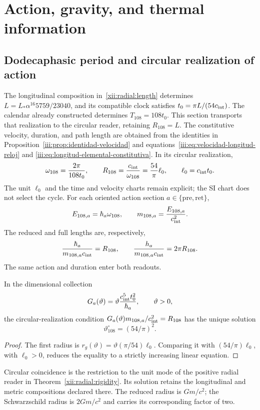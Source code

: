 \section{Action, gravity, and thermal information}
\label{v:ant:sec:gravity}
\subsection{Dodecaphasic period and circular realization of action}
The longitudinal composition in~\eqref{xii:radial:length} determines
\(L=L_*\alpha^{16}5759/23040\), and its compatible clock satisfies
\(t_0=\pi L/(54c_{\rm int})\). The calendar already constructed determines
$T_{108}=108t_0$. This section transports that realization to the
circular reader, retaining \(R_{108}=L\).
The constitutive velocity, duration, and path length are
obtained from the identities in
Proposition~\ref{iii:prop:identidad-velocidad} and
equations~\eqref{iii:eq:velocidad-longitud-reloj} and
\eqref{iii:eq:longitud-elemental-constitutiva}.
In its circular realization,
\[
\omega_{108}=\frac{2\pi}{108t_0},\qquad
R_{108}=\frac{c_{\rm int}}{\omega_{108}}
=\frac{54}{\pi}\ell_0,\qquad \ell_0=c_{\rm int}t_0.
\]
The unit $\ell_0$ and the time and velocity charts remain
explicit; the SI chart does not select the cycle.
For each oriented action section $a\in\{\mathrm{pre},\mathrm{ret}\}$,
\[
E_{108,a}=\hbar_a\omega_{108},\qquad
m_{108,a}=\frac{E_{108,a}}{c_{\rm int}^2}.
\]
The reduced and full lengths are, respectively,
\[
\frac{\hbar_a}{m_{108,a}c_{\rm int}}=R_{108},
\qquad
\frac{h_a}{m_{108,a}c_{\rm int}}=2\pi R_{108}.
\]
The same action and duration enter both readouts.

\begin{proposition}
In the dimensional collection
\[
G_a(\vartheta)=\vartheta\frac{c_{\rm int}^5t_0^2}{\hbar_a},
\qquad \vartheta>0,
\]
the circular-realization condition
$G_a(\vartheta)m_{108,a}/c_{\rm int}^2=R_{108}$
has the unique solution
\[
\vartheta^\circ_{108}=(54/\pi)^2.
\]
\end{proposition}
\begin{proof}
The first radius is
$r_g(\vartheta)=\vartheta(\pi/54)\ell_0$.
Comparing it with $(54/\pi)\ell_0$, with $\ell_0>0$, reduces the
equality to a strictly increasing linear equation.
\end{proof}
Circular coincidence is the restriction to the unit mode of the positive
radial reader in Theorem~\ref{xii:radial:rigidity}. Its solution
retains the longitudinal and metric compositions declared there.
The reduced radius is \(Gm/c^2\); the Schwarzschild radius is
\(2Gm/c^2\) and carries its corresponding factor of two.

